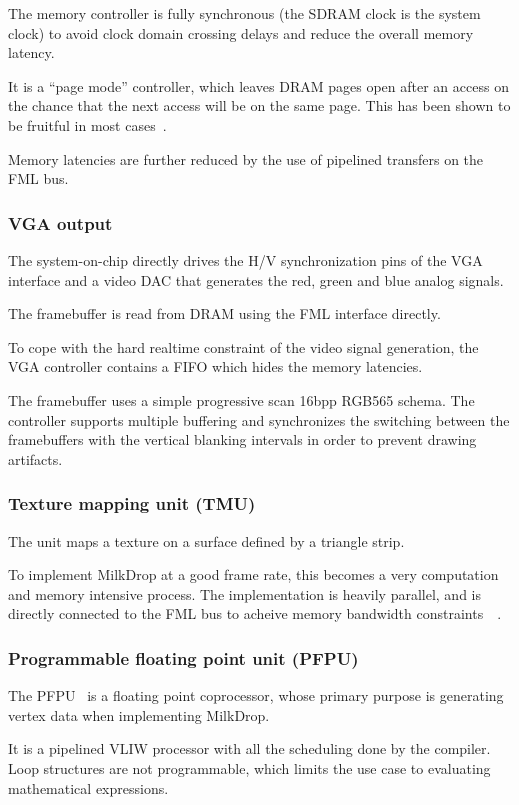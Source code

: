 \documentclass[a4paper,11pt,twocolumn]{paper}
\begin{document}
The memory controller is fully synchronous (the SDRAM clock is the system clock) to avoid clock domain crossing delays and reduce the overall memory latency.

It is a ``page mode'' controller, which leaves DRAM pages open after an access on the chance that the next access will be on the same page. This has been shown to be fruitful in most cases~\cite{pagemode}.

Memory latencies are further reduced by the use of pipelined transfers on the FML bus.

\subsubsection{VGA output}
The system-on-chip directly drives the H/V synchronization pins of the VGA interface and a video DAC that generates the red, green and blue analog signals.

The framebuffer is read from DRAM using the FML interface directly.

To cope with the hard realtime constraint of the video signal generation, the VGA controller contains a FIFO which hides the memory latencies.

The framebuffer uses a simple progressive scan 16bpp RGB565 schema. The controller supports multiple buffering and synchronizes the switching between the framebuffers with the vertical blanking intervals in order to prevent drawing artifacts.

\subsubsection{Texture mapping unit (TMU)}
The unit maps a texture on a surface defined by a triangle strip.

To implement MilkDrop at a good frame rate, this becomes a very computation and memory intensive process. The implementation is heavily parallel, and is directly connected to the FML bus to acheive memory bandwidth constraints~\cite{confslides}~\cite{tmu}.

\subsubsection{Programmable floating point unit (PFPU)}
The PFPU~\cite{pfpu} is a floating point coprocessor, whose primary purpose is generating vertex data when implementing MilkDrop.

It is a pipelined VLIW processor with all the scheduling done by the compiler. Loop structures are not programmable, which limits the use case to evaluating mathematical expressions.
\end{document}
